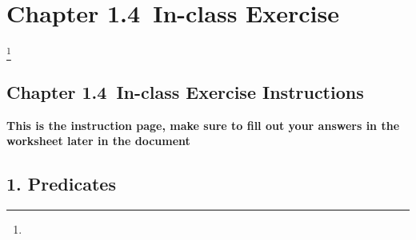 \documentclass[a4paper,12pt]{book}
\title{}
\author{Rachel Morris}
\date{\today}
\newcommand{\laChapter}{1.4\ }
\begin{document}
    \togglefalse{answerkey}


    \chapter*{Chapter \laChapter In-class Exercise} 
    \footnote{
        \iftoggle{answerkey}{
          \begin{answer} ANSWER KEY \end{answer}
        }{}
    }

    \begin{center} \section*{Chapter \laChapter In-class Exercise Instructions} \end{center}

    \begin{center}
        \textbf{This is the instruction page,
        make sure to fill out your answers in the worksheet later in the document}
    \end{center}

    \section*{1. Predicates}
\end{document}
